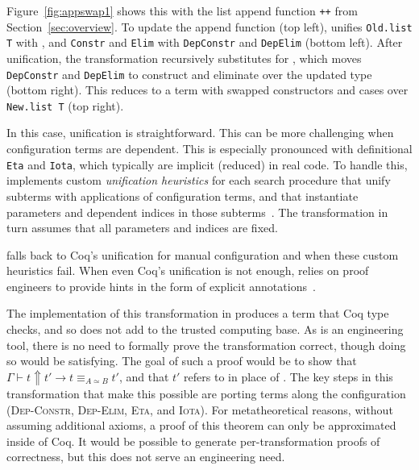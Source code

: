 Figure~\ref{fig:appswap1} shows this with the list append function \lstinline{++} from Section~\ref{sec:overview}.
To update the append function (top left), \toolname unifies \lstinline{Old.list T} with \A, and \lstinline{Constr} and \lstinline{Elim}
with \lstinline{DepConstr} and \lstinline{DepElim} (bottom left).
After unification, the transformation recursively substitutes \B
for \A, which moves \lstinline{DepConstr} and \lstinline{DepElim}
to construct and eliminate over the updated type (bottom right).
This reduces to a term with swapped constructors and cases over \lstinline{New.list T} (top right).

In this case, unification is straightforward. %
This can be more challenging when configuration terms are dependent.
This is especially pronounced with definitional \lstinline{Eta} and \lstinline{Iota},
which typically are implicit (reduced) in real code.
To handle this, \toolname implements custom \textit{unification heuristics} for each search procedure
that unify subterms with applications of configuration terms, and that instantiate parameters and dependent indices in those subterms~. %
The transformation in turn assumes that all parameters and indices are fixed.

\toolname falls back to Coq's unification for manual configuration and when these custom heuristics fail.
When even Coq's unification is not enough, \toolname relies on proof engineers to provide hints
in the form of explicit annotations~.

The implementation of this transformation in \toolname produces a term that Coq type checks, and so does not
add to the trusted computing base.
As \toolname is an engineering tool, there is no need to formally prove the transformation correct, though doing so would be satisfying.
The goal of such a proof would be to show that %
$\Gamma \vdash t \Uparrow t' \rightarrow t \equiv_{A \simeq B} t'$, and that $t'$ refers to \B in place of \A.
The key steps in this transformation that make this possible are porting terms along the configuration %
(\textsc{Dep-Constr}, \textsc{Dep-Elim}, \textsc{Eta}, and \textsc{Iota}).
For metatheoretical reasons, without assuming additional axioms, a proof of this theorem can only be approximated inside of Coq.
It would be possible to generate per-transformation proofs of correctness, but this does not serve an engineering need.

